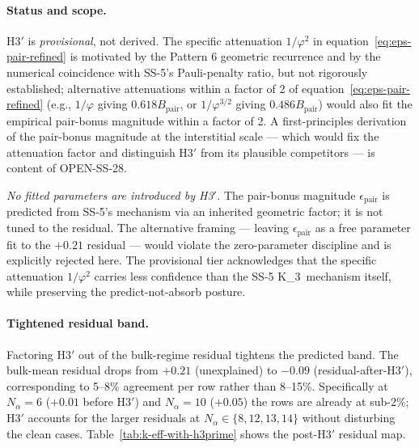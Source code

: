\documentclass[11pt,letterpaper]{article}
\theoremstyle{definition}
\newcommand{\phig}{\varphi}
\newcommand{\Bpair}{B_{\text{pair}}}
\newcommand{\Nalpha}{N_\alpha}
\newcommand{\Kthree}{K_3}
\begin{document}
\paragraph{Status and scope.}

H3$'$ is \emph{provisional}, not derived. The specific attenuation $1/\phig^2$ in equation~\eqref{eq:eps-pair-refined} is motivated by the Pattern 6 geometric recurrence and by the numerical coincidence with SS-5's Pauli-penalty ratio, but not rigorously established; alternative attenuations within a factor of 2 of equation~\eqref{eq:eps-pair-refined} (e.g., $1/\phig$ giving $0.618\Bpair$, or $1/\phig^{3/2}$ giving $0.486\Bpair$) would also fit the empirical pair-bonus magnitude within a factor of 2. A first-principles derivation of the pair-bonus magnitude at the interstitial scale --- which would fix the attenuation factor and distinguish H3$'$ from its plausible competitors --- is content of OPEN-SS-28.

\emph{No fitted parameters are introduced by H3$'$.} The pair-bonus magnitude $\epsilon_{\text{pair}}$ is predicted from SS-5's mechanism via an inherited geometric factor; it is not tuned to the residual. The alternative framing --- leaving $\epsilon_{\text{pair}}$ as a free parameter fit to the $+0.21$ residual --- would violate the zero-parameter discipline and is explicitly rejected here. The provisional tier acknowledges that the specific attenuation $1/\phig^2$ carries less confidence than the SS-5 \Kthree\ mechanism itself, while preserving the predict-not-absorb posture.

\paragraph{Tightened residual band.}

Factoring H3$'$ out of the bulk-regime residual tightens the predicted band. The bulk-mean residual drops from $+0.21$ (unexplained) to $-0.09$ (residual-after-H3$'$), corresponding to 5--8\% agreement per row rather than 8--15\%. Specifically at $\Nalpha = 6$ ($+0.01$ before H3$'$) and $\Nalpha = 10$ ($+0.05$) the rows are already at sub-2\%; H3$'$ accounts for the larger residuals at $\Nalpha \in \{8, 12, 13, 14\}$ without disturbing the clean cases. Table~\ref{tab:k-eff-with-h3prime} shows the post-H3$'$ residual map.
\end{document}
